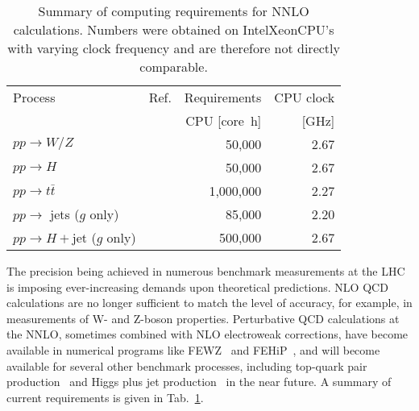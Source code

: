 \begin{table}
  \centering
  \begin{tabular}{llrr}
    \hline
    Process & Ref. & Requirements & CPU clock\\
    & & CPU [core~h] & [GHz]\\
    \hline\hline
    $pp\to W/Z$ & \cite{Melnikov:2006di,Li:2012wna} & 50,000 & 2.67 \\
    $pp\to H$ & \cite{Anastasiou:2005qj} & 50,000 & 2.67 \\
    $pp\to t\bar{t}$ & \cite{Baernreuther:2012ws,Czakon:2013goa} & 1,000,000 & 2.27\\
    $pp\to $ jets ($g$ only) & \cite{Ridder:2013mf} & 85,000 & 2.20 \\
    $pp\to H+$jet ($g$ only) & \cite{Boughezal:2013uia} & 500,000 & 2.67 \\
    \hline
  \end{tabular}
  \caption{Summary of computing requirements for NNLO calculations.
    Numbers were obtained on Intel\registered Xeon\registered CPU's with
    varying clock frequency and are therefore not directly comparable.
    \label{tab:nnlo_requirements}}
\end{table}

The precision being achieved in numerous benchmark measurements at the
LHC is imposing ever-increasing demands upon theoretical predictions.
NLO QCD calculations are no longer sufficient to match the level of
accuracy, for example, in measurements of W- and Z-boson properties.
Perturbative QCD calculations at the NNLO, sometimes combined with NLO
electroweak corrections, have become available in numerical programs
like FEWZ~\cite{Melnikov:2006kv,Li:2012wna} and
FEHiP~\cite{Anastasiou:2005qj}, and will become available for several
other benchmark processes, including top-quark pair
production~\cite{Baernreuther:2012ws,Czakon:2013goa} and Higgs plus
jet production~\cite{Boughezal:2013uia} in the near future. A summary 
of current requirements is given in Tab.~\ref{tab:nnlo_requirements}.

